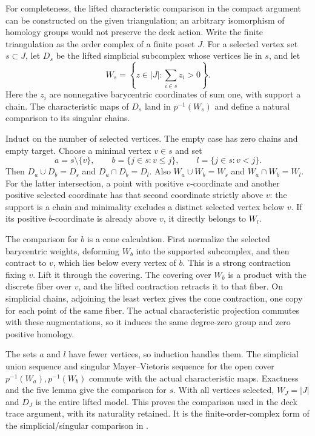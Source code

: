 For completeness, the lifted characteristic comparison in the compact
argument can be constructed on the given triangulation; an arbitrary
isomorphism of homology groups would not preserve the deck action.
Write the finite triangulation as the order complex of a finite poset
$J$. For a selected vertex set $s\subset J$, let $D_s$ be the lifted
simplicial subcomplex whose vertices lie in $s$, and let
\[
 W_s=\left\{z\in |J|:\sum_{i\in s}z_i>0\right\}.
\]
Here the $z_i$ are nonnegative barycentric coordinates of sum one,
with support a chain. The characteristic maps of $D_s$ land in
$p^{-1}(W_s)$ and define a natural comparison to its singular chains.

Induct on the number of selected vertices. The empty case has zero
chains and empty target. Choose a minimal vertex $v\in s$ and set
\[
 a=s\setminus\{v\},\qquad b=\{j\in s:v\leq j\},\qquad
 l=\{j\in s:v<j\}.
\]
Then $D_a\cup D_b=D_s$ and $D_a\cap D_b=D_l$.
Also $W_a\cup W_b=W_s$ and $W_a\cap W_b=W_l$.
For the latter intersection, a point with positive $v$-coordinate
and another positive selected coordinate has that second coordinate
strictly above $v$: the support is a chain and minimality excludes a
distinct selected vertex below $v$. If its positive $b$-coordinate
is already above $v$, it directly belongs to $W_l$.

The comparison for $b$ is a cone calculation. First normalize the
selected barycentric weights, deforming $W_b$ into the supported
subcomplex, and then contract to $v$, which lies below every vertex
of $b$. This is a strong contraction fixing $v$. Lift it through the
covering. The covering over $W_b$ is a product with the discrete
fiber over $v$, and the lifted contraction retracts it to that fiber.
On simplicial chains, adjoining the least vertex gives the cone
contraction, one copy for each point of the same fiber. The actual
characteristic projection commutes with these augmentations, so it
induces the same degree-zero group and zero positive homology.

The sets $a$ and $l$ have fewer vertices, so induction handles them.
The simplicial union sequence and singular Mayer--Vietoris sequence
for the open cover $p^{-1}(W_a),p^{-1}(W_b)$ commute with the actual
characteristic maps. Exactness and the five lemma give the comparison
for $s$. With all vertices selected, $W_J=|J|$ and $D_J$ is the
entire lifted model. This proves the comparison used in the deck trace
argument, with its naturality retained. It is the finite-order-complex
form of the simplicial/singular comparison in
\cite[Theorem 2.27, pp.~128--130]{Hatcher}.

